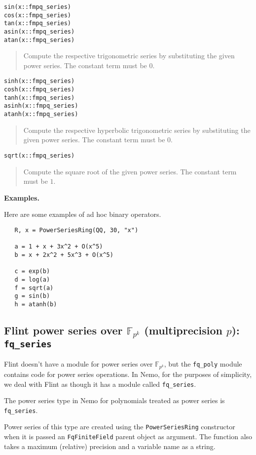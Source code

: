 \documentclass[a4paper,10pt]{article}
\newcommand{\F}{\mathbb{F}}
\newcommand{\code}{\lstinline}
\newcommand{\desc}[1]{\vspace{-3mm}\begin{quote}#1\end{quote}}
\begin{document}
{{\begin{lstlisting}
sin(x::fmpq_series)
cos(x::fmpq_series)
tan(x::fmpq_series)
asin(x::fmpq_series)
atan(x::fmpq_series)
\end{lstlisting}

\desc{Compute the respective trigonometric series by substituting the given power series.
The constant term must be $0$.}

\begin{lstlisting}
sinh(x::fmpq_series)
cosh(x::fmpq_series)
tanh(x::fmpq_series)
asinh(x::fmpq_series)
atanh(x::fmpq_series)
\end{lstlisting}

\desc{Compute the respective hyperbolic trigonometric series by substituting the given power
series. The constant term must be $0$.}

\begin{lstlisting}
sqrt(x::fmpq_series)
\end{lstlisting}

\desc{Compute the square root of the given power series. The constant term must be $1$.}

\textbf{Examples.}

Here are some examples of ad hoc binary operators.

\begin{lstlisting}
   R, x = PowerSeriesRing(QQ, 30, "x")

   a = 1 + x + 3x^2 + O(x^5)
   b = x + 2x^2 + 5x^3 + O(x^5)

   c = exp(b)
   d = log(a)
   f = sqrt(a)
   g = sin(b)
   h = atanh(b)   
\end{lstlisting}

\subsection{Flint power series over $\F_{p^k}$ (multiprecision $p$): \code{fq_series}}

Flint doesn't have a module for power series over $\F_{p^k}$, but the \code{fq_poly}
module contains code for power series operations. In Nemo, for the purposes of
simplicity, we deal with Flint as though it has a module called \code{fq_series}.

The power series type in Nemo for polynomials treated as power series is
\code{fq_series}. 

Power series of this type are created using the \code{PowerSeriesRing} constructor when
it is passed an \code{FqFiniteField} parent object as argument. The function also takes a
maximum (relative) precision and a variable name as a string.

}}
\end{document}
